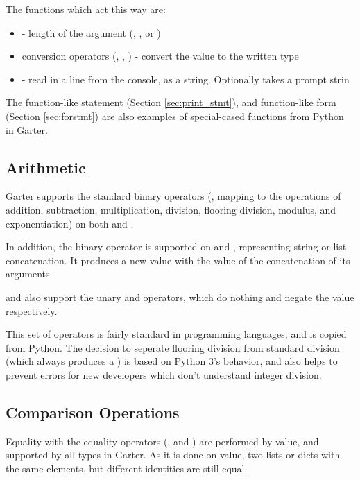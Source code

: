 The functions which act this way are:

\begin{itemize}
\item {} - length of the argument (, \code{[T]}, or )
\item conversion operators (, , ) - convert the value to the written type
\item {} - read in a line from the console, as a string. Optionally takes a prompt strin
\end{itemize}

The  function-like statement (Section \ref{sec:print_stmt}),
and  function-like form (Section \ref{sec:forstmt}) are also
examples of special-cased functions from Python in Garter.

\subsection{Arithmetic}

Garter supports the standard binary operators (\code{+ - * / // \% **}, mapping
to the operations of addition, subtraction, multiplication, division, flooring
division, modulus, and exponentiation) on both  and .

In addition, the \code{+} binary operator is supported on 
and \code{[T]}, representing string or list concatenation. It produces a new
value with the value of the concatenation of its arguments.

 and  also support the unary \code{+} and \code{-} operators,
which do nothing and negate the value respectively.

This set of operators is fairly standard in programming languages, and is copied
from Python. The decision to seperate flooring division from standard division
(which always produces a ) is based on Python 3's behavior, and also
helps to prevent errors for new developers which don't understand integer
division.

\subsection{Comparison Operations}

Equality with the equality operators (\code{==}, and \code{!=}) are performed by
value, and supported by all types in Garter. As it is done on value, two lists
or dicts with the same elements, but different identities are still equal.

